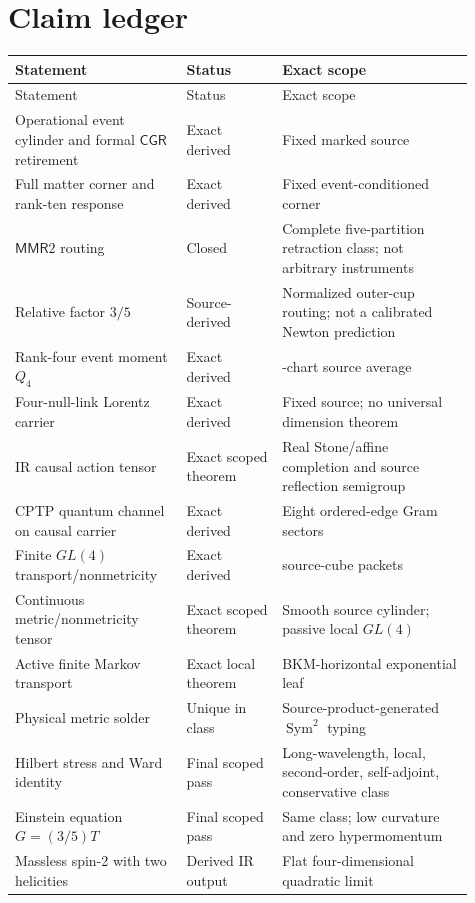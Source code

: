 \documentclass[11pt]{article}
\theoremstyle{definition}
\theoremstyle{remark}
\newcommand{\Sym}{\operatorname{Sym}}
\newcommand{\MMR}{\mathsf{MMR}}
\newcommand{\CGR}{\mathsf{CGR}}
\begin{document}
\section{Claim ledger}

\begin{longtable}{>{\raggedright\arraybackslash}p{0.34\linewidth} >{\raggedright\arraybackslash}p{0.19\linewidth} >{\raggedright\arraybackslash}p{0.38\linewidth}}
\toprule
Statement & Status & Exact scope \\
\midrule
\endfirsthead
\toprule
Statement & Status & Exact scope \\
\midrule
\endhead
Operational event cylinder and formal $\CGR$ retirement & Exact derived & Fixed marked source \\
Full matter corner and rank-ten response & Exact derived & Fixed event-conditioned corner \\
$\MMR2$ routing & Closed & Complete five-partition retraction class; not arbitrary instruments \\
Relative factor $3/5$ & Source-derived & Normalized outer-cup routing; not a calibrated Newton prediction \\
Rank-four event moment $Q_4$ & Exact derived & 24-chart source average \\
Four-null-link Lorentz carrier & Exact derived & Fixed source; no universal dimension theorem \\
IR causal action tensor & Exact scoped theorem & Real Stone/affine completion and source reflection semigroup \\
CPTP quantum channel on causal carrier & Exact derived & Eight ordered-edge Gram sectors \\
Finite $GL(4)$ transport/nonmetricity & Exact derived & 48 source-cube packets \\
Continuous metric/nonmetricity tensor & Exact scoped theorem & Smooth source cylinder; passive local $GL(4)$ \\
Active finite Markov transport & Exact local theorem & BKM-horizontal exponential leaf \\
Physical metric solder & Unique in class & Source-product-generated $\Sym^2$ typing \\
Hilbert stress and Ward identity & Final scoped pass & Long-wavelength, local, second-order, self-adjoint, conservative class \\
Einstein equation $G=(3/5)T$ & Final scoped pass & Same class; low curvature and zero hypermomentum \\
Massless spin-2 with two helicities & Derived IR output & Flat four-dimensional quadratic limit \\

\end{longtable}
\end{document}
